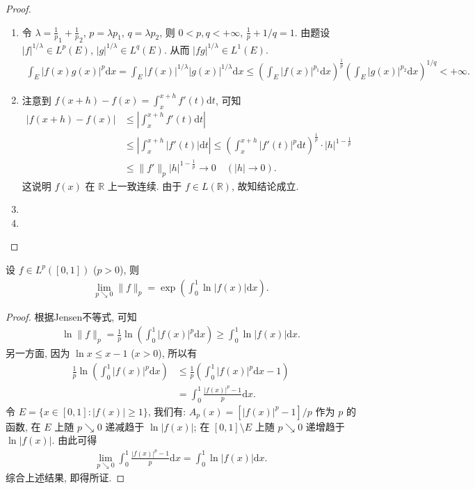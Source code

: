 \documentclass[../../main.tex]{subfiles}%
\begin{document}
\begin{proof}
\begin{enumerate}[(1)]
\item 令 $\lambda=\frac{1}{p}_1+\frac{1}{p}_2$, $p=\lambda p_1$, $q=\lambda p_2$, 则 $0<p,q<+\infty$, $\frac{1}{p}+1/q=1$. 由题设 $|f|^{1/\lambda}\in L^p(E)$, $|g|^{1/\lambda}\in L^q(E)$. 从而 $|fg|^{1/\lambda}\in L^1(E)$.
\begin{align*}
\int_E |f(x)g(x)|^p \mathrm{d}x = \int_E |f(x)|^{1/\lambda} |g(x)|^{1/\lambda} \mathrm{d}x 
\leqslant \left( \int_E |f(x)|^{p_1} \mathrm{d}x \right)^{\frac{1}{p}} \left( \int_E |g(x)|^{p_2} \mathrm{d}x \right)^{1/q} < +\infty.
\end{align*}

\item 注意到 $f(x+h)-f(x)=\int_x^{x+h} f'(t)\mathrm{d}t$, 可知
\begin{align*}
|f(x+h)-f(x)| &\leqslant \left| \int_x^{x+h} f'(t)\mathrm{d}t \right| \\
&\leqslant \left| \int_x^{x+h} |f'(t)|\mathrm{d}t \right| \leqslant \left( \int_x^{x+h} |f'(t)|^p \mathrm{d}t \right)^{\frac{1}{p}} \cdot |h|^{1-\frac{1}{p}} \\
&\leqslant \|f'\|_p |h|^{1-\frac{1}{p}} \to 0 \quad (|h|\to0).
\end{align*}
这说明 $f(x)$ 在 $\mathbb{R}$ 上一致连续. 由于 $f\in L(\mathbb{R})$, 故知结论成立.

\item 

\item 
\end{enumerate}
\end{proof}

\begin{example}
设 $f\in L^p([0,1])$ ($p>0$), 则
\begin{align*}
\lim_{p\searrow0} \|f\|_p = \exp\left( \int_0^1 \ln|f(x)|\mathrm{d}x \right).
\end{align*}
\end{example}
\begin{proof}
根据Jensen不等式, 可知
\begin{align*}
\ln\|f\|_p = \frac{1}{p} \ln\left( \int_0^1 |f(x)|^p \mathrm{d}x \right) \geqslant \int_0^1 \ln|f(x)|\mathrm{d}x.
\end{align*}
另一方面, 因为 $\ln x\leqslant x-1$ ($x>0$), 所以有
\begin{align*}
\frac{1}{p} \ln\left( \int_0^1 |f(x)|^p \mathrm{d}x \right) &\leqslant \frac{1}{p} \left( \int_0^1 |f(x)|^p \mathrm{d}x - 1 \right) \\
&= \int_0^1 \frac{|f(x)|^p - 1}{p} \mathrm{d}x.
\end{align*}
令 $E=\{x\in[0,1]: |f(x)|\geqslant1\}$, 我们有: $A_p(x)=[|f(x)|^p-1]/p$ 作为 $p$ 的函数, 在 $E$ 上随 $p\searrow0$ 递减趋于 $\ln|f(x)|$; 在 $[0,1]\setminus E$ 上随 $p\searrow0$ 递增趋于 $\ln|f(x)|$. 由此可得
\begin{align*}
\lim_{p\searrow0} \int_0^1 \frac{|f(x)|^p - 1}{p} \mathrm{d}x = \int_0^1 \ln|f(x)|\mathrm{d}x.
\end{align*}
综合上述结果, 即得所证.
\end{proof}
\end{document}
